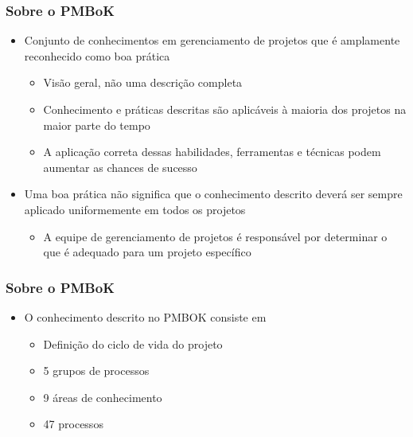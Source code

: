     \begin{frame}
   \frametitle{Sobre o PMBoK}
   \begin{itemize}
    \item Conjunto de conhecimentos em gerenciamento de projetos que é amplamente reconhecido como boa prática
    \begin{itemize}
     \item Visão geral, não uma descrição completa
     \item Conhecimento e práticas descritas são aplicáveis à maioria dos projetos na maior parte do tempo
     \item A aplicação correta dessas habilidades, ferramentas e técnicas podem aumentar as chances de sucesso
    \end{itemize}
    \item Uma boa prática não significa que o conhecimento descrito deverá ser sempre aplicado uniformemente em todos os projetos
    \begin{itemize}
     \item A equipe de gerenciamento de projetos é responsável por determinar o que é adequado para um projeto específico
    \end{itemize}
   \end{itemize}
  \end{frame} 	
  
      \begin{frame}
   \frametitle{Sobre o PMBoK}
   \begin{itemize}
    \item O conhecimento descrito no PMBOK consiste em
    \begin{itemize}
     \item Definição do ciclo de vida do projeto
     \item 5 grupos de processos
     \item 9 áreas de conhecimento
     \item 47 processos
    \end{itemize}
   \end{itemize}
  \end{frame}
  
